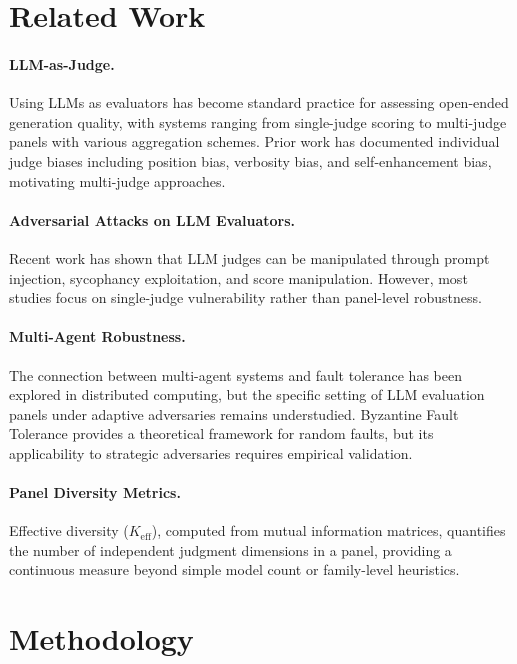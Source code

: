 \documentclass[11pt,a4paper]{article}
\begin{document}
\section{Related Work}
\label{sec:related}

\paragraph{LLM-as-Judge.}
Using LLMs as evaluators has become standard practice for assessing open-ended generation quality, with systems ranging from single-judge scoring to multi-judge panels with various aggregation schemes.
Prior work has documented individual judge biases including position bias, verbosity bias, and self-enhancement bias, motivating multi-judge approaches.

\paragraph{Adversarial Attacks on LLM Evaluators.}
Recent work has shown that LLM judges can be manipulated through prompt injection, sycophancy exploitation, and score manipulation.
However, most studies focus on single-judge vulnerability rather than panel-level robustness.

\paragraph{Multi-Agent Robustness.}
The connection between multi-agent systems and fault tolerance has been explored in distributed computing, but the specific setting of LLM evaluation panels under adaptive adversaries remains understudied.
Byzantine Fault Tolerance provides a theoretical framework for random faults, but its applicability to strategic adversaries requires empirical validation.

\paragraph{Panel Diversity Metrics.}
Effective diversity ($K_{\mathrm{eff}}$), computed from mutual information matrices, quantifies the number of independent judgment dimensions in a panel, providing a continuous measure beyond simple model count or family-level heuristics.

\section{Methodology}
\label{sec:method}
\end{document}
